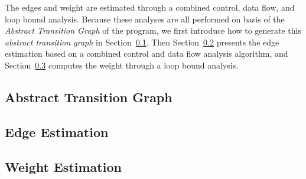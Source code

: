 The edges and weight are estimated through a combined control, data flow, and loop bound analysis.
Because these analyses are all performed on basis of the \emph{Abstract Transition Graph} of the program, we first introduce how to generate this \emph{abstract transition graph} in Section~\ref{sec:alg_abscfg}.
Then Section~\ref{sec:alg_edgegen} presents the edge estimation based on a combined control and data flow analysis algorithm,
and Section~\ref{sec:alg_weightgen}
computes the weight through a loop bound analysis.

\subsection{Abstract Transition Graph}
\label{sec:alg_abscfg}

%
\subsection{Edge Estimation}
\label{sec:alg_edgegen}

%

\subsection{Weight Estimation}
\label{sec:alg_weightgen}
